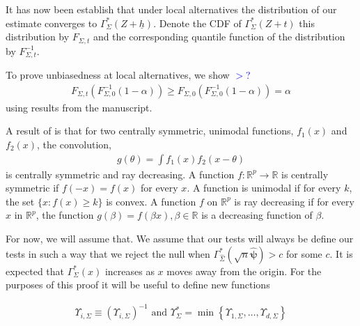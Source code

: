 \documentclass{article}
\newcommand{\vmat}{\Sigma}
\newcommand{\rvv}{Z}
\newcommand{\gi}{\Upsilon}
\begin{document}
It has now been establish that under local alternatives the distribution of our estimate converges to $\Gamma^*_{\Sigma}(Z + \underline{h})$.  Denote the CDF of $\Gamma^*_{\Sigma}(Z + t)$ this distribution by $F_{\Sigma, t}$ and the corresponding quantile function of the distribution by $F^{-1}_{\Sigma, t}$.  

To prove unbiasedness at local alternatives, we show \textcolor{blue}{$>$?}
\begin{align*}
	F_{\Sigma, t}(F^{-1}_{\Sigma, 0}(1 - \alpha)) \geq F_{\Sigma, 0}(F^{-1}_{\Sigma, 0}(1 - \alpha)) = \alpha
\end{align*}
using results from the \citep{anderson_integral_1955} manuscript.


A result of \citep{anderson_integral_1955} is that for two centrally symmetric, unimodal functions, $f_1(x)$ and  $f_2(x)$, the convolution,  
\begin{align*}
	g(\theta) = \int f_1(x) f_2(x - \theta)
\end{align*}
is centrally symmetric and ray decreasing.  A function $f :\mathbb{R}^p\rightarrow\mathbb{R}$ is centrally symmetric if $f(-x) = f(x)$ for every $x$.  A function is unimodal if for every $k$, the set $\{x : f(x) \geq k\}$ is convex. A function $f$ on $\mathbb{R}^p$ is ray decreasing if for every $x$ in $\mathbb{R}^p$, the function $g(\beta) = f(\beta x), \beta \in \mathbb{R}$ is a decreasing function of $\beta$.

For now, we will assume that.  We assume that our tests will always be define our tests in such a way that we reject the null when $\Gamma^*_{\hat{\vmat}}(\sqrt{n} \hat{\boldsymbol{\psi}}) > c$ for some $c$. It is expected that $\Gamma^*_{\vmat}(x)$  increases as $x$ moves away from the origin. For the purposes of this proof it will be useful to define new functions 

\begin{align*}
	\gi_{i, \Sigma} \equiv \left(\gi_{i, \Sigma}\right)^{-1} \text{ and } \gi_{\Sigma}^* = \min\left\{\gi_{1, \Sigma}, \dots, \gi_{d, \Sigma}\right\}
\end{align*} 
\end{document}
